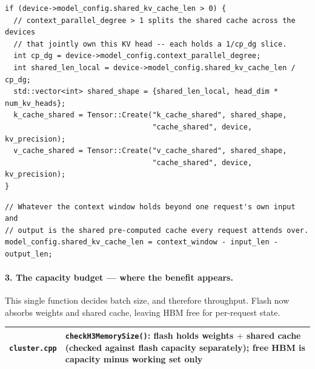 \documentclass[11pt,a4paper]{article}
\newcommand{\code}[1]{\texttt{#1}}
\begin{document}
\begin{lstlisting}[caption={\code{attention.cpp} --- one shared tensor per layer, sized independently of batch},captionpos=b]
if (device->model_config.shared_kv_cache_len > 0) {
  // context_parallel_degree > 1 splits the shared cache across the devices
  // that jointly own this KV head -- each holds a 1/cp_dg slice.
  int cp_dg = device->model_config.context_parallel_degree;
  int shared_len_local = device->model_config.shared_kv_cache_len / cp_dg;
  std::vector<int> shared_shape = {shared_len_local, head_dim * num_kv_heads};
  k_cache_shared = Tensor::Create("k_cache_shared", shared_shape,
                                  "cache_shared", device, kv_precision);
  v_cache_shared = Tensor::Create("v_cache_shared", shared_shape,
                                  "cache_shared", device, kv_precision);
}
\end{lstlisting}

\begin{lstlisting}[caption={\code{test.cpp} --- shared length derived from the workload, not configured},captionpos=b]
// Whatever the context window holds beyond one request's own input and
// output is the shared pre-computed cache every request attends over.
model_config.shared_kv_cache_len = context_window - input_len - output_len;
\end{lstlisting}

\paragraph{3. The capacity budget --- where the benefit appears.}
This single function decides batch size, and therefore throughput. Flash now
absorbs weights and shared cache, leaving HBM free for per-request state.

\begin{center}\small
\begin{tabular}{@{}p{5.0cm}p{9.3cm}@{}}
\toprule
\code{cluster.cpp} & \code{checkH3MemorySize()}: flash holds weights $+$
  shared cache (checked against flash capacity separately); free HBM is
  capacity minus working set only \\
\bottomrule
\end{tabular}
\end{center}
\end{document}
